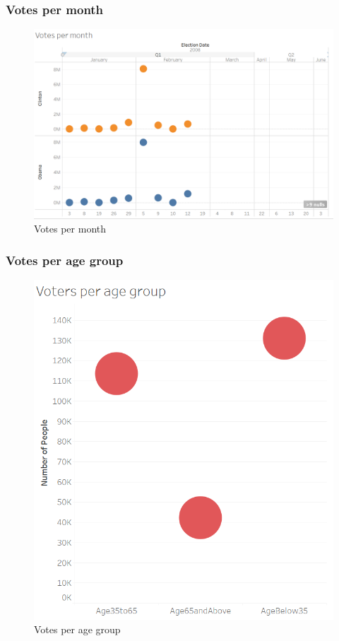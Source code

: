 \documentclass[11pt]{article}
\begin{document}
\subsubsection{Votes per month}
\begin{figure}[H]
    \centering
    \includegraphics[width=0.90\columnwidth]{assets/vote_month.PNG}
    \caption{Votes per month }
    \label{lr}
\end{figure}

\subsubsection{Votes per age group}
\begin{figure}[H]
    \centering
    \includegraphics[width=0.90\columnwidth]{assets/vote_age.PNG}
    \caption{Votes per age group }
    \label{lr}
\end{figure}
\end{document}
